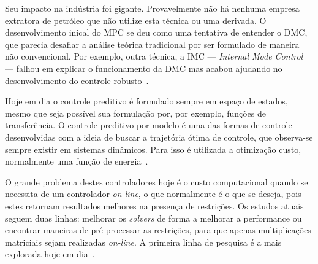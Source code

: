 Seu impacto na indústria foi gigante. Provavelmente não há nenhuma empresa
extratora de petróleo que não utilize esta técnica ou uma derivada. O
desenvolvimento inical do \ac{MPC} se deu como uma tentativa de entender o
\ac{DMC}, que parecia desafiar a análise teórica tradicional por ser formulado
de maneira não convencional. Por exemplo, outra técnica, a \ac{IMC} ---
\textit{Internal Mode Control} --- falhou em explicar o funcionamento da DMC mas
acabou ajudando no desenvolvimento do controle robusto~\cite{article:morari}.

Hoje em dia o controle preditivo é formulado sempre em espaço de estados, mesmo
que seja possível sua formulação por, por exemplo, funções de transferência.
O controle preditivo por modelo é uma das formas de controle desenvolvidas com
a ideia de buscar a trajetória ótima de controle, que observa-se sempre existir
em sistemas dinâmicos. Para isso é utilizada a otimização custo, normalmente uma
função de energia~\cite{article:morari,book:bryson}.

O grande problema destes controladores hoje é o custo computacional quando se
necessita de um controlador \textit{on-line}, o que normalmente é o que se
deseja, pois estes retornam resultados melhores na presença de restrições. Os
estudos atuais seguem duas linhas: melhorar os \textit{solvers} de forma a
melhorar a performance ou encontrar maneiras de pré-processar as restrições,
para que apenas multiplicações matriciais sejam realizadas \textit{on-line}. A
primeira linha de pesquisa é a mais explorada hoje em
dia~\cite{book:wang,masterthesis:zhang}.

